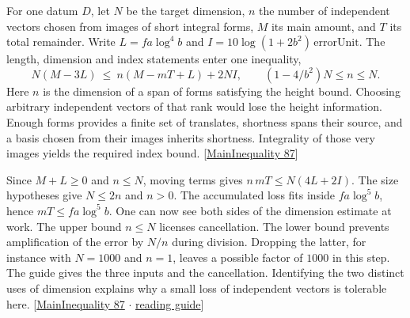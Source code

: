 \documentclass[12pt,letterpaper]{article}
\begin{document}
For one datum $D$, let $N$ be the target dimension, $n$ the number of independent vectors chosen from images of short integral forms, $M$ its main amount, and $T$ its total remainder. Write $L=f a\log^4 b$ and $I=10\log(1+2b^2)\,\mathrm{errorUnit}$. The length, dimension and index statements enter one inequality,
\[
 N(M-3L)\ \le\ n(M-mT+L)+2NI,\qquad
 (1-4/b^2)N\le n\le N .
\]
Here $n$ is the dimension of a span of forms satisfying the height bound. Choosing arbitrary independent vectors of that rank would lose the height information. Enough forms provides a finite set of translates, shortness spans their source, and a basis chosen from their images inherits shortness. Integrality of those very images yields the required index bound. {\small\sffamily\color{mute}[\href{https://github.com/leanprover-community/riemann-hypothesis/blob/e063a923620ee7787b4a1270421478645bf66bdb/src/New/Reduction/MainInequality.lean#L87}{MainInequality 87}]}

Since $M+L\ge0$ and $n\le N$, moving terms gives $n\,mT\le N(4L+2I)$. The size hypotheses give $N\le2n$ and $n>0$. The accumulated loss fits inside $f a\log^5 b$, hence $mT\le f a\log^5 b$. One can now see both sides of the dimension estimate at work. The upper bound $n\le N$ licenses cancellation. The lower bound prevents amplification of the error by $N/n$ during division. Dropping the latter, for instance with $N=1000$ and $n=1$, leaves a possible factor of $1000$ in this step. The guide gives the three inputs and the cancellation. Identifying the two distinct uses of dimension explains why a small loss of independent vectors is tolerable here. {\small\sffamily\color{mute}[\href{https://github.com/leanprover-community/riemann-hypothesis/blob/e063a923620ee7787b4a1270421478645bf66bdb/src/New/Reduction/MainInequality.lean#L87}{MainInequality 87} $\cdot$ \href{https://github.com/leanprover-community/riemann-hypothesis/blob/e063a923620ee7787b4a1270421478645bf66bdb/GUIDE.md#L1}{reading guide}]}
\end{document}
